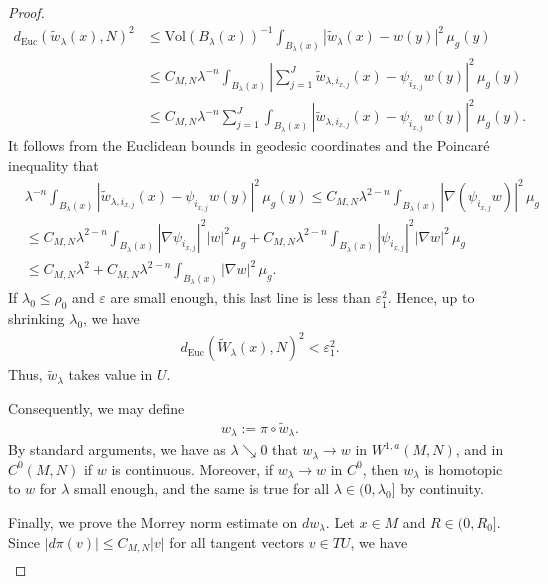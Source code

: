 \documentclass[12pt]{amsart}
\renewcommand{\1}{{\mathbf 1}}
\theoremstyle{others}
\numberwithin{equation}{section}
\begin{document}
\begin{proof}
\begin{align*}
        d_{\text{Euc}}(\tilde{w}_\lambda(x), N)^2 & \leq \text{Vol}(B_\lambda(x))^{-1} \int_{B_\lambda(x)} |\tilde{w}_\lambda(x) - w(y)|^2 \, \mu_g(y) \\
        &\leq C_{M, N}\lambda^{-n} \int_{B_\lambda(x)} |\sum_{j = 1}^J \tilde{w}_{\lambda, i_{x, j}}(x) - \psi_{i_{x, j}} w(y)|^2 \, \mu_g(y) \\
        &\leq C_{M, N}\lambda^{-n} \sum_{j = 1}^J\int_{B_\lambda(x)} | \tilde{w}_{\lambda, i_{x, j}}(x) - \psi_{i_{x, j}} w(y)|^2 \, \mu_g(y).
    \end{align*} 
     It follows from the Euclidean bounds in geodesic coordinates and the Poincar{\'e} inequality that
    \begin{align*}
        &\lambda^{-n} \int_{B_\lambda(x)} | \tilde{w}_{\lambda, i_{x, j}}(x) - \psi_{i_{x, j}} w(y)|^2 \, \mu_g(y) \leq C_{M, N}\lambda^{2-n} \int_{B_\lambda(x)} |\nabla (\psi_{i_{x, j}} w)|^2 \, \mu_g \\
        &\leq C_{M, N}\lambda^{2-n} \int_{B_\lambda(x)} |\nabla \psi_{i_{x, j}}|^2|w|^2 \, \mu_g + C_{M, N} \lambda^{2-n} \int_{B_\lambda(x)} |\psi_{i_{x, j}}|^2|\nabla w|^2 \, \mu_g \\
        &\leq C_{M, N} \lambda^2 + C_{M, N}\lambda^{2-n} \int_{B_\lambda(x)} |\nabla w|^2 \, \mu_g.
    \end{align*} If \(\lambda_0 \leq \rho_0\) and \(\varepsilon\) are small enough, this last line is less than \(\varepsilon_1^2\). Hence, up to shrinking \(\lambda_0\), we have
    \begin{align*}
        d_{\text{Euc}}(\tilde{W}_\lambda(x), N)^2  < \varepsilon_1^2.
    \end{align*} Thus, \(\tilde{w}_\lambda\) takes value in \(U\). \par 
    Consequently, we may define
    \begin{align*}
        w_\lambda := \pi \circ \tilde{w}_\lambda.
    \end{align*}By standard arguments, we have as \(\lambda \searrow 0\) that \(w_\lambda \to w\) in \(W^{1, a}(M, N)\), and in \(C^0(M, N)\) if \(w\) is continuous. Moreover, if \(w_\lambda \to w\) in \(C^0\), then \(w_\lambda\) is homotopic to \(w\) for \(\lambda\) small enough, and the same is true for all \(\lambda \in (0, \lambda_0]\) by continuity. \par 
    Finally, we prove the Morrey norm estimate on \(dw_\lambda\). 
    Let \(x \in M\) and \(R \in (0, R_0]\). Since \(|d\pi(v)| \leq C_{M, N}|v|\) for all tangent vectors \(v \in TU\), we have
    \begin{align*}

\end{align*}
\end{proof}
\end{document}
